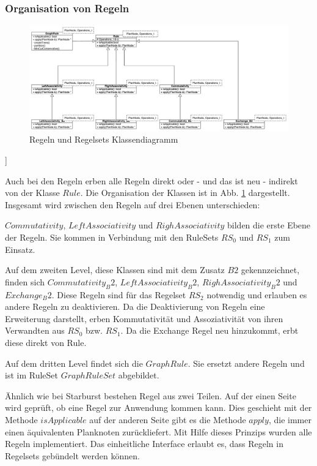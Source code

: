 \subsubsection{Organisation von Regeln}


\begin{figure}[h]
  \centering
  \includegraphics[height=0.5\textwidth , angle=90]{04_Implementierung/Rules.pdf}
  \caption{Regeln und Regelsets Klassendiagramm}
  \label{RuleClassDiagram}
\end{figure}]


Auch bei den Regeln erben alle Regeln direkt oder - und das ist neu - indirekt von der Klasse $Rule$. Die Organisation der Klassen ist in Abb. \ref{RuleClassDiagram} dargestellt. Insgesamt wird zwischen den Regeln auf drei Ebenen unterschieden: 

$Commutativity$, $LeftAssociativity$ und $RighAssociativity$ bilden die erste Ebene der Regeln. Sie kommen in Verbindung mit den RuleSets $RS_0$ und $RS_1$ zum Einsatz.

Auf dem zweiten Level, diese Klassen sind mit dem Zusatz $B2$ gekennzeichnet, finden sich $Commutativity_B2$, $LeftAssociativity_B2$, $RighAssociativity_B2$ und $Exchange_B2$. Diese Regeln sind für das Regelset $RS_2$ notwendig und erlauben es andere Regeln zu deaktivieren. Da die Deaktivierung von Regeln eine Erweiterung darstellt, erben Kommutativität und Assoziativität von ihren Verwandten aus $RS_0$ bzw. $RS_1$. Da die Exchange Regel neu hinzukommt, erbt diese direkt von Rule.

Auf dem dritten Level findet sich die $GraphRule$. Sie ersetzt andere Regeln und ist im RuleSet $GraphRuleSet$ abgebildet.


Ähnlich wie bei Starburst bestehen Regel aus zwei Teilen. Auf der einen Seite wird geprüft, ob eine Regel zur Anwendung kommen kann. Dies geschieht mit der Methode $isApplicable$ auf der anderen Seite gibt es die Methode $apply$, die immer einen äquivalenten Planknoten zurückliefert. Mit Hilfe dieses Prinzips wurden alle Regeln implementiert. Das einheitliche Interface erlaubt es, dass Regeln in Regelsets gebündelt werden können.


